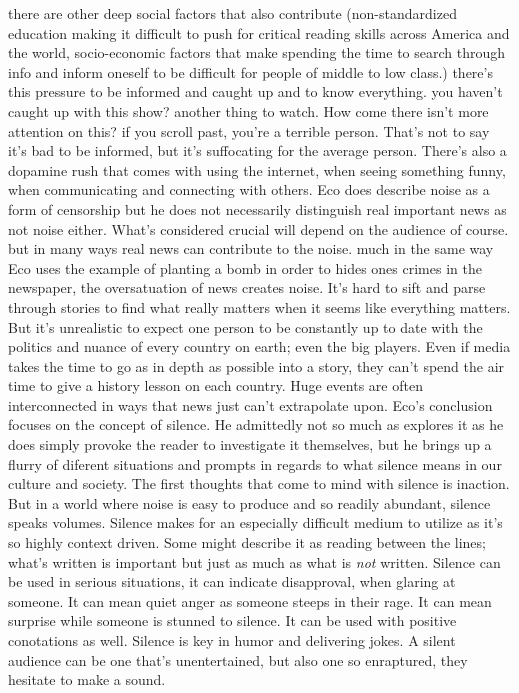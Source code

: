\documentclass{article}
\begin{document}
there are other deep social factors that also contribute (non-standardized education making it difficult to push for critical reading skills across America and the world, socio-economic factors that make spending the time to search through info and inform oneself to be difficult for people of middle to low class.) there's this pressure to be informed and caught up and to know everything. you haven't caught up with this show? another thing to watch. How come there isn't more attention on this? if you scroll past, you're a terrible person. That's not to say it's bad to be informed, but it's suffocating for the average person. There's also a dopamine rush that comes with using the internet, when seeing something funny, when communicating and connecting with others. Eco does describe noise as a form of censorship but he does not necessarily distinguish real important news as not noise either. What's considered crucial will depend on the audience of course. but in many ways real news can contribute to the noise. much in the same way Eco uses the example of planting a bomb in order to hides ones crimes in the newspaper, the oversatuation of news creates noise. It's hard to sift and parse through stories to find what really matters when it seems like everything matters. But it's unrealistic to expect one person to be constantly up to date with the politics and nuance of every country on earth; even the big players. Even if media takes the time to go as in depth as possible into a story, they can't spend the air time to give a history lesson on each country. Huge events are often interconnected in ways that news just can't extrapolate upon.
Eco's conclusion focuses on the concept of silence. He admittedly not so much as explores it as he does simply provoke the reader to investigate it themselves, but he brings up a flurry of diferent situations and prompts in regards to what silence means in our culture and society. The first thoughts that come to mind with silence is inaction. But in a world where noise is easy to produce and so readily abundant, silence speaks volumes. Silence makes for an especially difficult medium to utilize as it's so highly context driven. Some might describe it as reading between the lines; what's written is important but just as much as what is \textit{not} written. Silence can be used in serious situations, it can indicate disapproval, when glaring at someone. It can mean quiet anger as someone steeps in their rage. It can mean surprise while someone is stunned to silence. It can be used with positive conotations as well. Silence is key in humor and delivering jokes. A silent audience can be one that's unentertained, but also one so enraptured, they hesitate to make a sound.  
\end{document}
